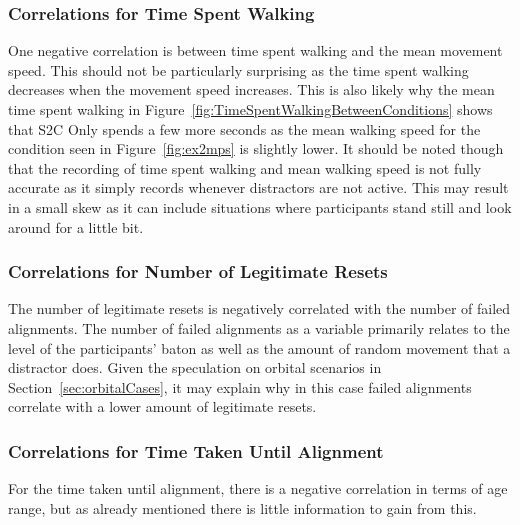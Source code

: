 \subsubsection{Correlations for Time Spent Walking}
One negative correlation is between time spent walking and the mean movement speed. This should not be particularly surprising as the time spent walking decreases when the movement speed increases. This is also likely why the mean time spent walking in Figure~\ref{fig:TimeSpentWalkingBetweenConditions} shows that S2C Only spends a few more seconds as the mean walking speed for the condition seen in Figure~\ref{fig:ex2mps} is slightly lower. It should be noted though that the recording of time spent walking and mean walking speed is not fully accurate as it simply records whenever distractors are not active. This may result in a small skew as it can include situations where participants stand still and look around for a little bit. 

\subsubsection{Correlations for Number of Legitimate Resets}
The number of legitimate resets is negatively correlated with the number of failed alignments. The number of failed alignments as a variable primarily relates to the level of the participants' baton as well as the amount of random movement that a distractor does. Given the speculation on orbital scenarios in Section~\ref{sec:orbitalCases}, it may explain why in this case failed alignments correlate with a lower amount of legitimate resets. 

\subsubsection{Correlations for Time Taken Until Alignment}
For the time taken until alignment, there is a negative correlation in terms of age range, but as already mentioned there is little information to gain from this.
